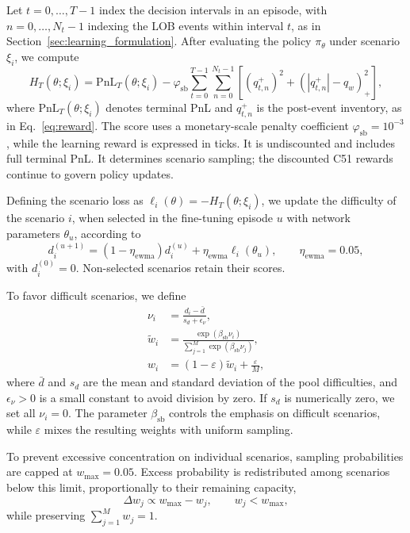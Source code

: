 \documentclass[11pt,a4paper]{article}
\begin{document}
Let $t=0,\ldots,T-1$ index the decision intervals in an
episode, with $n=0,\ldots,N_t-1$ indexing the LOB events
within interval $t$, as in
Section~\ref{sec:learning_formulation}. After evaluating the
policy $\pi_\theta$ under scenario $\xi_i$, we compute
\[
  H_T(\theta;\xi_i)
  =
  \mathrm{PnL}_T(\theta;\xi_i)
  -
  \varphi_{\mathrm{sb}}\sum_{t=0}^{T-1}\sum_{n=0}^{N_t-1}
  \left[
    (q^+_{t,n})^2
    +
    (|q^+_{t,n}|-q_w)_+^2
  \right],
\]
where $\mathrm{PnL}_T(\theta;\xi_i)$ denotes terminal PnL
and $q^+_{t,n}$ is the post-event inventory, as in
Eq.~\eqref{eq:reward}. The score uses a monetary-scale penalty
coefficient $\varphi_{\mathrm{sb}}=10^{-3}$, while the learning
reward is expressed in ticks. It is undiscounted and includes
full terminal PnL. It determines scenario sampling;
the discounted C51 rewards continue to govern policy updates.

Defining the scenario loss as
$\ell_i(\theta)=-H_T(\theta;\xi_i)$, we update the difficulty
of the scenario $i$, when selected in the fine-tuning episode $u$ with
network parameters $\theta_u$, according to
\begin{equation}
  d_i^{(u+1)}
  =
  (1-\eta_{\mathrm{ewma}})d_i^{(u)}
  +
  \eta_{\mathrm{ewma}}\ell_i(\theta_u),
  \qquad
  \eta_{\mathrm{ewma}}=0.05,
  \label{eq:difficulty_ewma}
\end{equation}
with $d_i^{(0)}=0$. Non-selected scenarios retain their scores.

To favor difficult scenarios, we define
\[
  \begin{aligned}
  \nu_i
  &=
  \frac{d_i-\bar d}{s_d+\epsilon_\nu},
  \\[3pt]
  \widetilde w_i
  &=
  \frac{\exp(\beta_{\mathrm{sb}}\nu_i)}
       {\sum_{j=1}^{M}\exp(\beta_{\mathrm{sb}}\nu_j)},
  \\[3pt]
  w_i
  &=
  (1-\varepsilon)\widetilde w_i
  +\frac{\varepsilon}{M},
  \end{aligned}
\]
where $\bar d$ and $s_d$ are the mean and standard deviation
of the pool difficulties, and $\epsilon_\nu>0$ is a small
constant to avoid division by zero. If $s_d$ is numerically zero, we set all $\nu_i=0$.
The parameter $\beta_{\mathrm{sb}}$ controls the emphasis on
difficult scenarios, while $\varepsilon$ mixes the resulting
weights with uniform sampling.

To prevent excessive concentration on individual
scenarios, sampling probabilities are capped at
$w_{\max}=0.05$. Excess probability is redistributed
among scenarios below this limit, proportionally to
their remaining capacity,
\[
  \Delta w_j \propto w_{\max}-w_j,
  \qquad w_j<w_{\max},
\]
while preserving $\sum_{j=1}^{M}w_j=1$.
\end{document}
